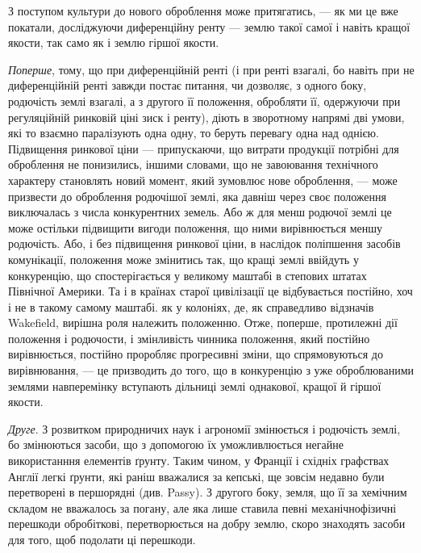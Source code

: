З поступом культури до нового оброблення може притягатись, — як ми це
вже покатали, досліджуючи диференційну ренту — землю такої самої і навіть
кращої якости, так само як і землю гіршої якости.

\emph{Поперше}, тому, що при диференційній ренті (і при ренті взагалі, бо
навіть при не диференційній ренті завжди постає питання, чи дозволяє, з одного
боку, родючість землі взагалі, а з другого її положення, обробляти її,
одержуючи при регуляційній ринковій ціні зиск і ренту), діють в зворотному
напрямі дві умови, які то взаємно паралізують одна одну, то беруть
перевагу одна над однією. Підвищення ринкової ціни — припускаючи, що витрати
продукції потрібні для оброблення не понизились, іншими словами, що
не завоювання технічного характеру становлять новий момент, який зумовлює
нове оброблення, — може призвести до оброблення родючішої землі, яка давніш
через своє положення виключалась з числа конкурентних земель. Або ж для
менш родючої землі це може остільки підвищити вигоди положення, що ними
вирівнюється меншу родючість. Або, і без підвищення ринкової ціни, в наслідок
поліпшення засобів комунікації, положення може змінитись так, що кращі землі
ввійдуть у конкуренцію, що спостерігається у великому маштабі в степових
штатах Північної Америки. Та і в країнах старої цивілізації це відбувається
постійно, хоч і не в такому самому маштабі. як у колоніях, де, як справедливо
відзначів Wakefield, вирішна роля належить положенню. Отже, поперше,
протилежні дії положення і родючости, і змінливість чинника положення, який
постійно вирівнюється, постійно проробляє прогресивні зміни, що спрямовуються
до вирівнювання, — це призводить до того, що в конкуренцію з уже оброблюваними
землями навперемінку вступають дільниці землі однакової, кращої й
гіршої якости.

\emph{Друге}. З розвитком природничих наук і агрономії змінюється і родючість
землі, бо змінюються засоби, що з допомогою їх уможливлюється негайне
використанння елементів ґрунту. Таким чином, у Франції і східніх графствах
Англії легкі ґрунти, які раніш вважалися за кепські, ще зовсім недавно були
перетворені в першорядні (див. Passy). З другого боку, земля, що її за хемічним
складом не вважалось за погану, але яка лише ставила певні механічнофізичні
перешкоди обробіткові, перетворюється на добру землю, скоро знаходять
засоби для того, щоб подолати ці перешкоди.

